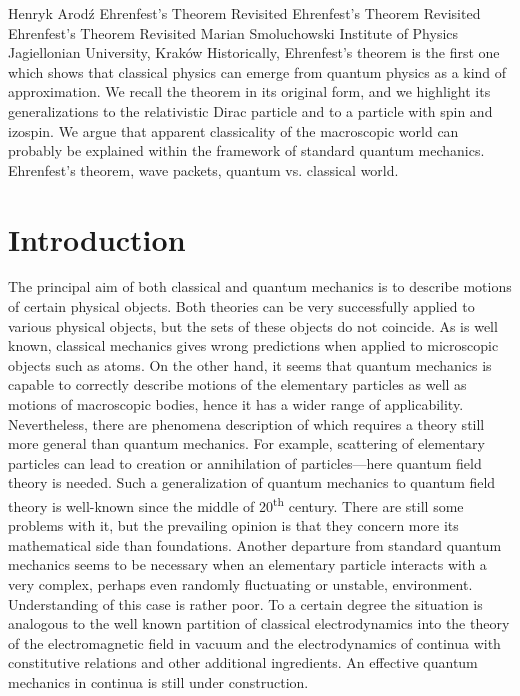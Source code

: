 \begin{artengenv}{Henryk Arod\'z}
	{Ehrenfest's Theorem Revisited}
	{Ehrenfest's Theorem Revisited}
	{Ehrenfest's Theorem Revisited}
	{Marian Smoluchowski Institute of Physics \\ Jagiellonian University, Krak\'ow\label{arodz-start}}
	{Historically, Ehrenfest's theorem \parencite*{ehr} is the first one which shows that classical physics can emerge from quantum physics as a kind of approximation. We recall the theorem in its original form, and we highlight its generalizations to the relativistic Dirac particle and to a particle with spin and izospin. We argue that apparent classicality of the macroscopic world can probably be explained within the framework of standard quantum mechanics.}
	{Ehrenfest's theorem, wave packets, quantum vs. classical world.}







\section{Introduction}


\lettrine[loversize=0.13,lines=2,lraise=-0.05,nindent=0em,findent=0.2pt]%
{T}{}he principal aim of both classical and quantum mechanics is to describe motions of certain physical objects. Both theories can be very successfully applied to various physical objects, but the sets of these objects do not coincide. As is well known, classical mechanics gives wrong predictions when applied to microscopic objects such as atoms. On the other hand, it seems that quantum mechanics is capable to correctly describe motions of the elementary particles as well as motions of macroscopic bodies, hence it has a wider range of applicability. Nevertheless, there are phenomena description of which requires a theory still more general than quantum mechanics. For example, scattering of elementary particles can lead to creation or annihilation of particles---here quantum field theory is needed. Such a generalization of quantum mechanics to quantum field theory is well-known since the middle of 20\textsuperscript{th} century. There are still some problems with it, but the prevailing opinion is that they concern more its mathematical side than foundations. Another departure from standard quantum mechanics seems to be necessary when an elementary particle interacts with a very complex, perhaps even randomly fluctuating or unstable, environment. Understanding of this case is rather poor. To a certain degree the situation is analogous to the well known partition of classical electrodynamics into the theory of the electromagnetic field in vacuum and the electrodynamics of 
continua with constitutive relations and other additional ingredients. An effective quantum mechanics in continua is still 
under construction. 






\end{artengenv}
